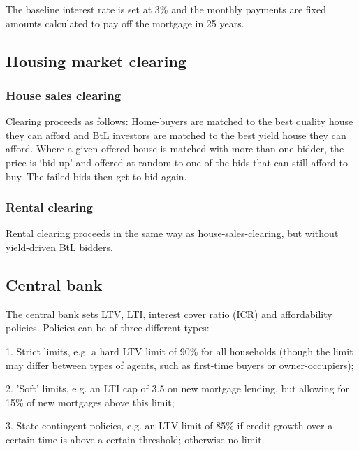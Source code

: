 \documentclass{article}
\begin{document}
The baseline interest rate is set at 3\% and the monthly payments are fixed
amounts calculated to pay off the mortgage in 25 years.

\subsection{Housing market clearing}

\subsubsection{House sales clearing}

Clearing proceeds as follows: Home-buyers are matched to the best quality
house they can afford and BtL investors are matched to the best yield house
they can afford. Where a given offered house is matched with more than one
bidder, the price is `bid-up' and offered at random to one of the bids that
can still afford to buy. The failed bids then get to bid again.

\subsubsection{Rental clearing}

Rental clearing proceeds in the same way as house-sales-clearing, but
without yield-driven BtL bidders.\bigskip

\subsection{Central bank}

The central bank sets LTV, LTI, interest cover ratio (ICR) and affordability
policies. Policies can be of three different types:

1. Strict limits, e.g. a hard LTV limit of 90\% for all households (though
the limit may differ between types of agents, such as first-time buyers or
owner-occupiers);

2. 'Soft' limits, e.g. an LTI cap of 3.5 on new mortgage lending, but
allowing for 15\% of new mortgages above this limit;

3. State-contingent policies, e.g. an LTV limit of 85\% if credit growth
over a certain time is above a certain threshold; otherwise no limit.
\end{document}
